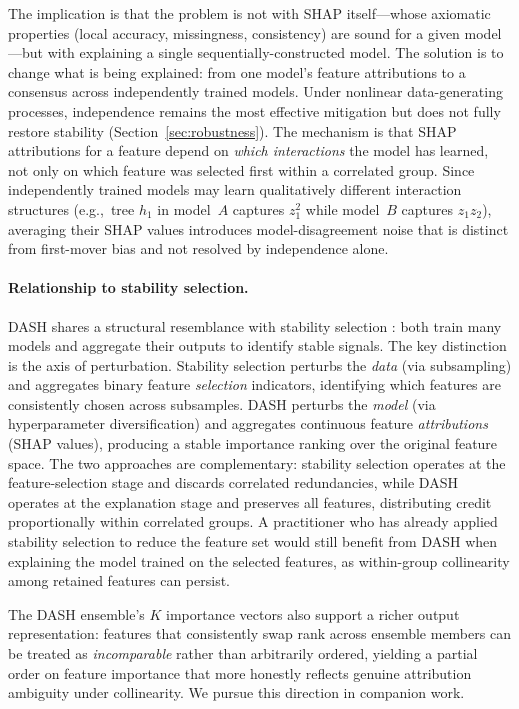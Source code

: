 \documentclass[11pt]{article}
\newcommand{\dash}{\textsc{DASH}}
\newcommand{\eg}{e.g.,\ }
\begin{document}
The implication is that the problem is not with SHAP itself---whose
axiomatic properties (local accuracy, missingness, consistency) are
sound for a given model---but with explaining a single
sequentially-constructed model. The solution is to change what is
being explained: from one model's feature attributions to a consensus
across independently trained models. Under nonlinear data-generating
processes, independence remains the most effective mitigation but does
not fully restore stability (Section~\ref{sec:robustness}). The
mechanism is that SHAP attributions for a feature depend on \emph{which
interactions} the model has learned, not only on which feature was
selected first within a correlated group. Since independently trained
models may learn qualitatively different interaction structures
(\eg tree $h_1$ in model~$A$ captures $z_1^2$ while model~$B$ captures
$z_1 z_2$), averaging their SHAP values introduces model-disagreement
noise that is distinct from first-mover bias and not resolved by
independence alone.

\paragraph{Relationship to stability selection.}
\dash{} shares a structural resemblance with stability selection
\citep{meinshausen2010stability}: both train many models and aggregate
their outputs to identify stable signals. The key distinction is the
axis of perturbation. Stability selection perturbs the \emph{data}
(via subsampling) and aggregates binary feature \emph{selection}
indicators, identifying which features are consistently chosen across
subsamples. \dash{} perturbs the \emph{model} (via hyperparameter
diversification) and aggregates continuous feature \emph{attributions}
(SHAP values), producing a stable importance ranking over the original
feature space. The two approaches are complementary: stability selection
operates at the feature-selection stage and discards correlated
redundancies, while \dash{} operates at the explanation stage and
preserves all features, distributing credit proportionally within
correlated groups. A practitioner who has already applied stability
selection to reduce the feature set would still benefit from \dash{}
when explaining the model trained on the selected features, as
within-group collinearity among retained features can persist.

The \dash{} ensemble's $K$ importance vectors also support a richer
output representation: features that consistently swap rank across
ensemble members can be treated as \emph{incomparable} rather than
arbitrarily ordered, yielding a partial order on feature importance
that more honestly reflects genuine attribution ambiguity under
collinearity. We pursue this direction in companion work.
\end{document}
